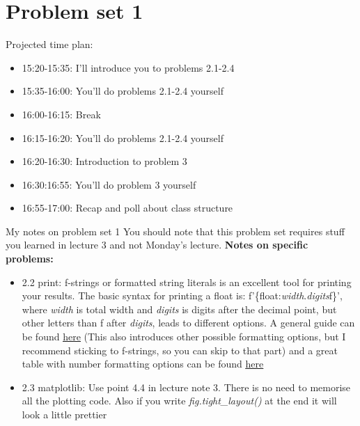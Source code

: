 \documentclass[10pt,danish,t,10pt]{beamer}
\newcommand{\code}[1]{\textit{#1}} %
\begin{document}
\section{Problem set 1}

\begin{frame}{Projected time plan:}
\begin{itemize}
    \item 15:20-15:35: I'll introduce you to problems 2.1-2.4
    \item 15:35-16:00: You'll do problems 2.1-2.4 yourself
    \item 16:00-16:15: Break
    \item 16:15-16:20: You'll do problems 2.1-2.4 yourself
    \item 16:20-16:30: Introduction to problem 3
    \item 16:30:16:55: You'll do problem 3 yourself
    \item 16:55-17:00: Recap and poll about class structure
\end{itemize}
    
\end{frame}



\begin{frame}{My notes on problem set 1}
    You should note that this problem set requires stuff you learned in lecture 3 and not Monday's lecture. \newline
    \textbf{Notes on specific problems:}
    \begin{itemize}
        \item 2.2 print: f-strings or formatted string literals is an excellent tool for printing your results. The basic syntax for printing a float is: f'\{float:\code{width}.\code{digits}f\}', where \code{width} is total width and \code{digits} is digits after the decimal point, but other letters than f after \code{digits}, leads to different options. A general guide can be found \href{https://realpython.com/python-f-strings/}{\underline{here}} (This also introduces other possible formatting options, but I recommend sticking to f-strings, so you can skip to that part) and a great table with number formatting options can be found \href{https://mkaz.blog/code/python-string-format-cookbook/}{\underline{here}}
        \item 2.3 matplotlib: Use point 4.4 in lecture note 3. There is no need to memorise all the plotting code. Also if you write \code{fig.tight\_layout()} at the end it will look a little prettier
    \end{itemize}
\end{frame}
\end{document}
